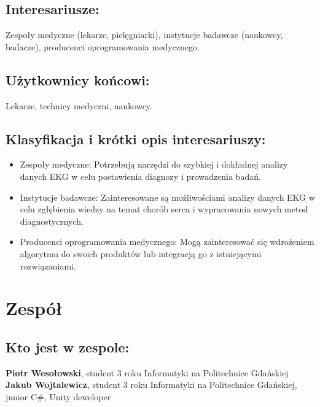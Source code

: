 \documentclass[12pt]{article}
\begin{document}
        \subsection*{Interesariusze:}
            Zespoły medyczne (lekarze, pielęgniarki), instytucje badawcze (naukowcy, badacze), producenci oprogramowania medycznego.  

        \subsection*{Użytkownicy końcowi:}
            Lekarze, technicy medyczni, naukowcy.  

        \subsection*{Klasyfikacja i krótki opis interesariuszy:}

            \begin{itemize}
                \item
                Zespoły medyczne: Potrzebują narzędzi do szybkiej i dokładnej analizy danych EKG w celu postawienia diagnozy i prowadzenia badań.  

                \item
                Instytucje badawcze: Zainteresowane są możliwościami analizy danych EKG w celu zgłębienia wiedzy na temat chorób serca i wypracowania nowych metod diagnostycznych.  

                \item
                Producenci oprogramowania medycznego: Mogą zainteresować się wdrożeniem algorytmu do swoich
                produktów lub integracją go z istniejącymi rozwiązaniami.
            \end{itemize}

    \section{Zespół}
        
        \subsection*{Kto jest w zespole:}
            \textbf{Piotr Wesołowski}, student 3 roku Informatyki na Politechnice Gdańskiej \\
            \textbf{Jakub Wojtalewicz}, student 3 roku Informatyki na Politechnice Gdańskiej, junior C\#, Unity deweloper
\end{document}
